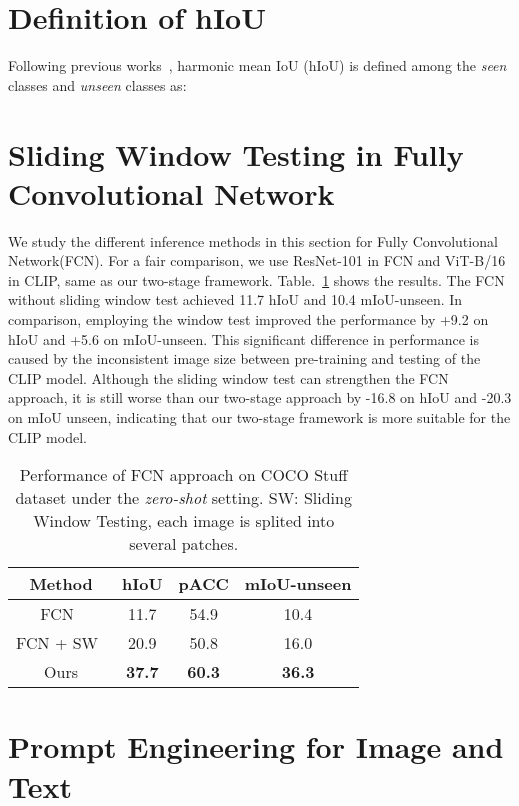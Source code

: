 \documentclass[runningheads]{llncs}
\begin{document}
\section{Definition of hIoU}
Following previous works~\cite{xian2019semantic,pastore2021closer}, harmonic mean IoU (hIoU) is defined among the \emph{seen} classes and \emph{unseen} classes as:




\section{Sliding Window Testing in Fully Convolutional Network}
We study the different inference methods in this section for Fully Convolutional Network(FCN). For a fair comparison, we use ResNet-101 in FCN and ViT-B/16 in CLIP, same as our two-stage framework. Table.~\ref{tab:fcn} shows the results. The FCN without sliding window test achieved 11.7 hIoU and 10.4 mIoU-unseen. In comparison, employing the window test improved the performance by +9.2 on hIoU and +5.6 on mIoU-unseen. This significant difference in performance is caused by the inconsistent image size between pre-training and testing of the CLIP model. Although the sliding window test can strengthen the FCN approach, it is still worse than our two-stage approach by -16.8 on hIoU and -20.3 on mIoU unseen, indicating that our two-stage framework is more suitable for the CLIP model.

\begin{table}[]
    \footnotesize
    \centering
    \caption{Performance of FCN approach on COCO Stuff dataset under the \emph{zero-shot} setting. SW: Sliding Window Testing, each image is splited into several  patches.}
    \begin{tabular}{c|c|c|c}
    \toprule
    Method & hIoU & pACC & mIoU-unseen\\
  \hline
    FCN~\cite{long2015fully} &11.7& 54.9 & 10.4\\
    FCN + SW~\cite{long2015fully} &20.9 & 50.8 &16.0  \\
    \hline
    Ours & \textbf{37.7}&\textbf{60.3}&\textbf{36.3}\\
    \bottomrule
    \end{tabular}
    \label{tab:fcn}
    \vspace{-2em}
\end{table}

\section{Prompt Engineering for Image and Text}
\end{document}
